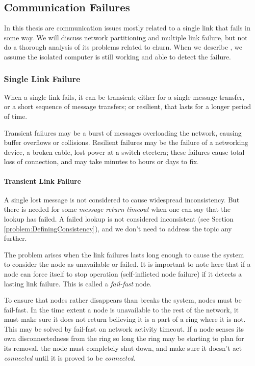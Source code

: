 \subsection{Communication Failures}
\label{analysis:CommunicationFailure}

In this thesis are communication issues mostly related to a single link that
 fails in some way. We will discuss network partitioning and multiple link failure,
 but not do a thorough analysis of its problems related to churn.
 When we describe , we assume the isolated computer is
 still working and able to detect the failure.

\subsubsection{Single Link Failure}
\label{analysis:SingleLinkFailure}

When a single link fails, it can be transient; either for a single message
 transfer, or a short sequence of message transfers; or resilient, that lasts for a
 longer period of time.

Transient failures may be a burst of messages overloading the network, causing buffer
 overflows or collisions. Resilient failures may be the failure of a
 networking device, a broken cable, lost power at a switch etcetera; these failures
 cause total loss of connection, and may take minutes to hours or days to fix.
 
\paragraph{Transient Link Failure}

A single lost message is not considered to cause widespread inconsistency. But there is
 needed for some \emph{message return timeout} when one can say that the lookup has failed. A failed
 lookup is not considered inconsistent (see Section \ref{problem:DefiningConsistency}), and we
 don't need to address the topic any further.

The problem arises when the link failures lasts long enough to cause the system to consider
 the node as unavailable or failed. It is important to note here that if a node can force
 itself to stop operation (self-inflicted node failure)
 if it detects a lasting link failure. This is called a \emph{fail-fast} node.

To ensure that nodes rather disappears than breaks the system, nodes must be fail-fast.
 In the time extent a node is unavailable to the rest of the network, it must make sure
 it does not return believing it is a part of a ring where it is not. This may be solved
 by fail-fast on network activity timeout. If a node senses its own disconnectedness
 from the ring so long the ring may be starting to plan for its removal, the node must
 completely shut down, and make sure it doesn't act \emph{connected} until it is proved
 to be \emph{connected}.

